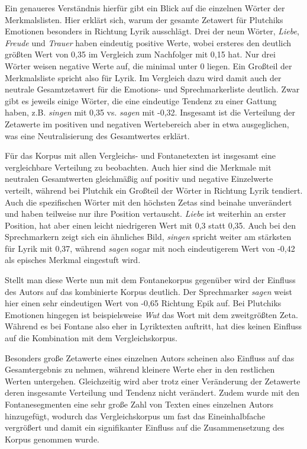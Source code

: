 \documentclass[a4paper,10p]{article}
\begin{document}
Ein genaueres Verständnis hierfür gibt ein Blick auf die einzelnen Wörter der Merkmalslisten. Hier erklärt sich, warum der gesamte Zetawert für Plutchiks Emotionen besonders in Richtung Lyrik ausschlägt. Drei der neun Wörter, \textit{Liebe}, \textit{Freude} und \textit{Trauer} haben eindeutig positive Werte, wobei ersteres den deutlich größten Wert von 0,35 im Vergleich zum Nachfolger mit 0,15 hat. Nur drei Wörter weisen negative Werte auf, die minimal unter 0 liegen. Ein Großteil der Merkmalsliste spricht also für Lyrik. Im Vergleich dazu wird damit auch der neutrale Gesamtzetawert für die Emotions- und Sprechmarkerliste deutlich. Zwar gibt es jeweils einige Wörter, die eine eindeutige Tendenz zu einer Gattung haben, z.B. \textit{singen} mit 0,35 vs. \textit{sagen} mit -0,32. Insgesamt ist die Verteilung der Zetawerte im positiven und negativen Wertebereich aber in etwa ausgeglichen, was eine Neutralisierung des Gesamtwertes erklärt. \par 

Für das Korpus mit allen Vergleichs- und Fontanetexten ist insgesamt eine vergleichbare Verteilung zu beobachten. Auch hier sind die Merkmale mit neutralen Gesamtwerten gleichmäßig auf positiv und negative Einzelwerte verteilt, während bei Plutchik ein Großteil der Wörter in Richtung Lyrik tendiert. Auch die spezifischen Wörter mit den höchsten Zetas sind beinahe unverändert und haben teilweise nur ihre Position vertauscht. \textit{Liebe} ist weiterhin an erster Position, hat aber einen leicht niedrigeren Wert mit 0,3 statt 0,35. Auch bei den Sprechmarkern zeigt sich ein ähnliches Bild, \textit{singen} spricht weiter am stärksten für Lyrik mit 0,37, während \textit{sagen} sogar mit noch eindeutigerem Wert von -0,42 als episches Merkmal eingestuft wird. \par 

Stellt man diese Werte nun mit dem Fontanekorpus gegenüber wird der Einfluss des Autors auf das kombinierte Korpus deutlich. Der Sprechmarker \textit{sagen} weist hier einen sehr eindeutigen Wert von -0,65 Richtung Epik auf. Bei Plutchiks Emotionen hingegen ist beispielsweise \textit{Wut} das Wort mit dem zweitgrößten Zeta. Während es bei Fontane also eher in Lyriktexten auftritt, hat dies keinen Einfluss auf die Kombination mit dem Vergleichskorpus. \par 


Besonders große Zetawerte eines einzelnen Autors scheinen also Einfluss auf das Gesamtergebnis zu nehmen, während kleinere Werte eher in den restlichen Werten untergehen. Gleichzeitig wird aber trotz einer Veränderung der Zetawerte deren insgesamte Verteilung und Tendenz nicht verändert. Zudem wurde mit den Fontanesegmenten eine sehr große Zahl von Texten eines einzelnen Autors hinzugefügt, wodurch das Vergleichskorpus um fast das Eineinhalbfache vergrößert und damit ein signifikanter Einfluss auf die Zusammensetzung des Korpus genommen wurde. \par 
\end{document}
